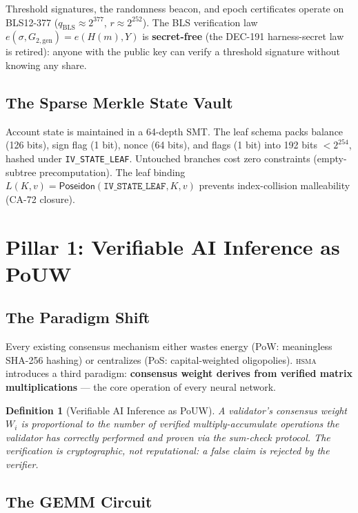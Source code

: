 \documentclass[11pt, a4paper]{article}
\newtheorem{definition}[theorem]{Definition}
\newcommand{\hsma}{\textsc{hsma}}
\begin{document}
Threshold signatures, the randomness beacon, and epoch certificates operate on BLS12-377 ($q_{\text{BLS}} \approx 2^{377}$, $r \approx 2^{252}$). The BLS verification law $e(\sigma, G_{2,\mathrm{gen}}) = e(H(m), Y)$ is \textbf{secret-free} (the DEC-191 harness-secret law is retired): anyone with the public key can verify a threshold signature without knowing any share.

\subsection{The Sparse Merkle State Vault}

Account state is maintained in a 64-depth SMT. The leaf schema packs balance (126 bits), sign flag (1 bit), nonce (64 bits), and flags (1 bit) into 192 bits $< 2^{254}$, hashed under \texttt{IV\_STATE\_LEAF}. Untouched branches cost zero constraints (empty-subtree precomputation). The leaf binding $L(K,v) = \textsf{Poseidon}(\texttt{IV\_STATE\_LEAF}, K, v)$ prevents index-collision malleability (CA-72 closure).

\section{Pillar 1: Verifiable AI Inference as PoUW}

\subsection{The Paradigm Shift}

Every existing consensus mechanism either wastes energy (PoW: meaningless SHA-256 hashing) or centralizes (PoS: capital-weighted oligopolies). \hsma{} introduces a third paradigm: \textbf{consensus weight derives from verified matrix multiplications} --- the core operation of every neural network.

\begin{definition}[Verifiable AI Inference as PoUW]
A validator's consensus weight $W_i$ is proportional to the number of \emph{verified} multiply-accumulate operations the validator has correctly performed and proven via the sum-check protocol. The verification is cryptographic, not reputational: a false claim is rejected by the verifier.
\end{definition}

\subsection{The GEMM Circuit}
\end{document}
